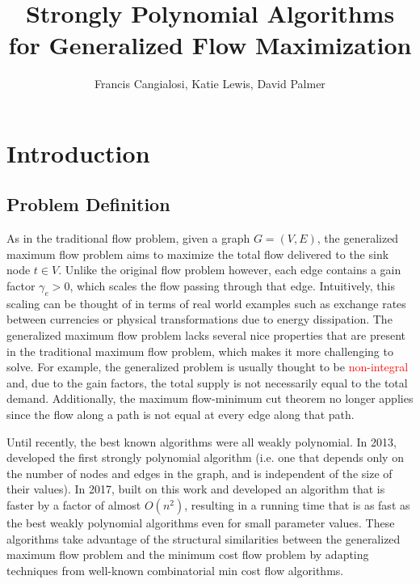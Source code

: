 \documentclass[11pt]{article}
\title{Strongly Polynomial Algorithms for Generalized Flow Maximization}
\author{Francis Cangialosi, Katie Lewis, David Palmer}
\date{}
\theoremstyle{definition}
\theoremstyle{definition}
\newcommand{\rewrite}[1]{\textcolor{red}{#1}}
\begin{document}
\maketitle
\section{Introduction}
	\subsection{Problem Definition}
	As in the traditional flow problem, given a
	graph $G = (V,E)$, the generalized maximum flow problem aims to maximize the
	total flow delivered to the sink node $t \in V$. Unlike the original flow
	problem however, each edge contains a gain factor $\gamma_e > 0$, which scales
	the flow passing through that edge. Intuitively, this scaling can be thought
	of in terms of real world examples such as exchange rates between currencies
	or physical transformations due to energy dissipation. The generalized maximum
	flow problem lacks several nice properties that are present in the traditional
	maximum flow problem, which makes it more challenging to solve. For example,
	the generalized problem is usually thought to be \rewrite{non-integral} and,
	due to the gain factors, the total supply is not necessarily equal to the total
	demand. Additionally, the maximum flow-minimum cut theorem no longer applies
	since the flow along a path is not equal at every edge along that path.
    
	Until recently, the best known algorithms were all weakly polynomial. In
	2013, \cite{Vegh2013} developed the first strongly polynomial algorithm
	(i.e. one that depends only on the number of nodes and edges in the graph,
	and is independent of the size of their values). In 2017, \cite{Olver2017}
	built on this work and developed an algorithm that is faster by a factor of
	almost $O(n^2)$, resulting in a running time that is as fast as the best
	weakly polynomial algorithms even for small parameter values. These
	algorithms take advantage of the structural similarities between the
	generalized maximum flow problem and the minimum cost flow problem by
	adapting techniques from well-known combinatorial min cost flow algorithms.
    
\end{document}
